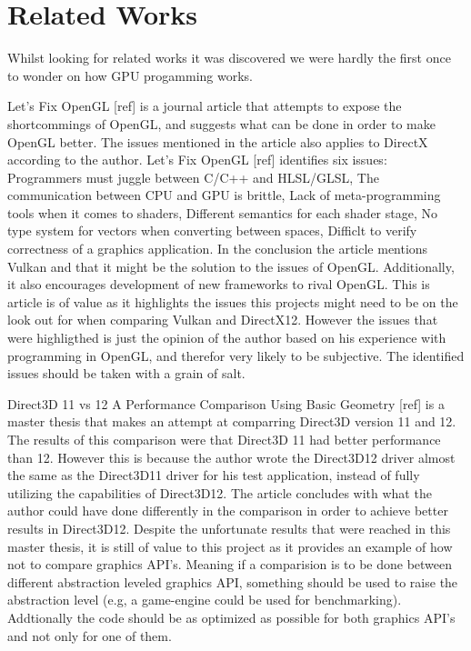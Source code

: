 \section{Related Works}\label{sec:problem_statement}
\begin{sectionmeta}
Whilst looking for related works it was discovered we were hardly the first once to wonder on how GPU progamming works.

Let's Fix OpenGL [ref] is a journal article that attempts to expose the shortcommings of OpenGL, and suggests what can be done in order to make OpenGL better. 
The issues mentioned in the article also applies to DirectX according to the author. 
Let's Fix OpenGL [ref] identifies six issues: 
Programmers must juggle between C/C++ and HLSL/GLSL, 
The communication between CPU and GPU is brittle,
Lack of meta-programming tools when it comes to shaders,
Different semantics for each shader stage,
No type system for vectors when converting between spaces,
Difficlt to verify correctness of a graphics application.
In the conclusion the article mentions Vulkan and that it might be the solution to the issues of OpenGL. Additionally, it also encourages development of new frameworks to rival OpenGL.
This is article is of value as it highlights the issues this projects might need to be on the look out for when comparing Vulkan and DirectX12. 
However the issues that were highligthed is just the opinion of the author based on his experience with programming in OpenGL, and therefor very likely to be subjective. 
The identified issues should be taken with a grain of salt.

Direct3D 11 vs 12 A Performance Comparison Using Basic Geometry [ref] is a master thesis that makes an attempt at comparring Direct3D version 11 and 12. 
The results of this comparison were that Direct3D 11 had better performance than 12. 
However this is because the author wrote the Direct3D12 driver almost the same as the Direct3D11 driver for his test application, instead of fully utilizing the capabilities of Direct3D12. 
The article concludes with what the author could have done differently in the comparison in order to achieve better results in Direct3D12.
Despite the unfortunate results that were reached in this master thesis, it is still of value to this project as it provides an example of how not to compare graphics API's. 
Meaning if a comparision is to be done between different abstraction leveled graphics API, something should be used to raise the abstraction level  (e.g, a game-engine could be used for benchmarking). 
Addtionally the code should be as optimized as possible for both graphics API's and not only for one of them.


\end{sectionmeta}
